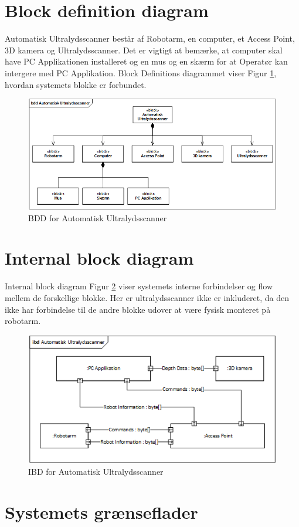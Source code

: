 \section{Block definition diagram}
Automatisk Ultralydsscanner består af Robotarm, en computer, et Access Point, 3D kamera og Ultralydsscanner. Det er vigtigt at bemærke, at computer skal have PC Applikationen installeret og en mus og en skærm for at Operatør kan intergere med PC Applikation. Block Definitions diagrammet viser Figur \ref{BDD}, hvordan systemets blokke er forbundet. 

\begin{figure}[H]
    \centering
    \includegraphics[width=1\textwidth]{figurer/d/Design/BDD}
    \caption{BDD for Automatisk Ultralydsscanner}
    \label{BDD}
\end{figure}

\section{Internal block diagram}
Internal block diagram Figur \ref{IBD} viser systemets interne forbindelser og flow mellem de forskellige blokke. Her er ultralydsscanner ikke er inkluderet, da den ikke har forbindelse til de andre blokke udover at være fysisk monteret på robotarm. 

\begin{figure}[H]
    \centering
    \includegraphics[width=1\textwidth]{figurer/d/Design/IBD}
    \caption{IBD for Automatisk Ultralydsscanner}
    \label{IBD}
\end{figure}

\section{Systemets grænseflader}